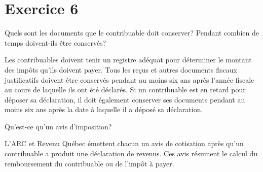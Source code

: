 \section{Exercice 6}
\setcounter{question}{0}
\begin{question}
	Quels sont les documents que le contribuable doit conserver? Pendant combien de temps doivent-ils être conservés?
\end{question}
Les contribuables doivent tenir un registre adéquat pour déterminer le montant des impôts qu'ils doivent payer. Tous les reçus et autres documents fiscaux justificatifs doivent être conservés pendant au moins six ans après l'année fiscale au cours de laquelle ils ont été déclarés. Si un contribuable est en retard pour déposer sa déclaration, il doit également conserver ses documents pendant au moins six ans après la date à laquelle il a déposé sa déclaration.

\begin{question}
	Qu'est-ce qu'un avis d'imposition?
\end{question}
L'ARC et Revenu Québec émettent chacun un avis de cotisation après qu'un contribuable a produit une déclaration de revenus. Ces avis résument le calcul du remboursement du contribuable ou de l'impôt à payer.



